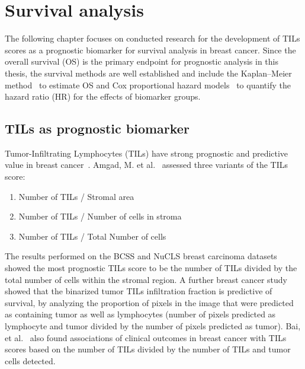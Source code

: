 \section{Survival analysis}
The following chapter focuses on conducted research for the development of TILs scores as a prognostic biomarker for survival analysis in breast cancer.
Since the overall survival (OS) is the primary endpoint for prognostic analysis in this thesis,
the survival methods are well established and include the Kaplan–Meier method~\cite{kaplan1958nonparametric} to estimate OS
and Cox proportional hazard models~\cite{https://doi.org/10.1111/j.2517-6161.1972.tb00899.x} to quantify the hazard ratio (HR) for the effects of biomarker
groups.
\subsection{TILs as prognostic biomarker}
Tumor-Infiltrating Lymphocytes (TILs) have strong prognostic and predictive value in breast cancer~\cite{kos2020pitfalls, amgad2022mutils}. Amgad, M. et al.~\cite{amgad2022mutils} assessed three variants of the TILs score:
\begin{enumerate}
    \itemsep0em 
    \item Number of TILs / Stromal area 
    \item Number of TILs / Number of cells in stroma
    \item Number of TILs / Total Number of cells 
\end{enumerate}
The results performed on the BCSS and NuCLS breast carcinoma datasets~\cite{amgad2019structured, amgad2021nucls} showed the most prognostic TILs score to be the number of TILs divided by the total number of cells within the stromal region.
A further breast cancer study~\cite{le2020utilizing} showed that the binarized tumor TILs infiltration fraction is predictive of survival, by analyzing the proportion of pixels in the image that were predicted as containing tumor as well as lymphocytes (number of pixels predicted as lymphocyte and tumor divided by the number of pixels predicted as tumor).
Bai, et al.~\cite{bai2021open} also found associations of clinical outcomes in breast cancer with TILs scores based on
the number of TILs divided by the number of TILs and tumor cells detected.

